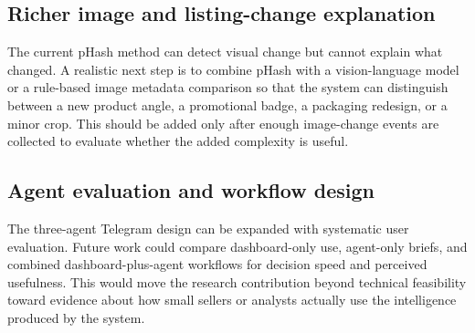\subsection{Richer image and listing-change explanation}

The current pHash method can detect visual change but cannot explain what changed. A realistic next step is to combine pHash with a vision-language model or a rule-based image metadata comparison so that the system can distinguish between a new product angle, a promotional badge, a packaging redesign, or a minor crop. This should be added only after enough image-change events are collected to evaluate whether the added complexity is useful.

\subsection{Agent evaluation and workflow design}

The three-agent Telegram design can be expanded with systematic user evaluation. Future work could compare dashboard-only use, agent-only briefs, and combined dashboard-plus-agent workflows for decision speed and perceived usefulness. This would move the research contribution beyond technical feasibility toward evidence about how small sellers or analysts actually use the intelligence produced by the system.
